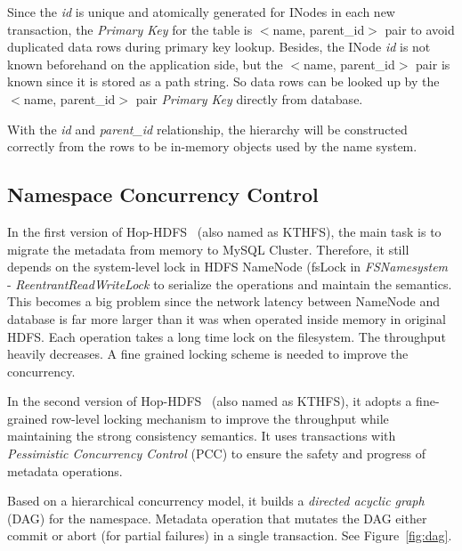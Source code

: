 \noindent Since the \textit{id} is unique and atomically generated for INodes in each new transaction, the \textit{Primary Key} for the table is $<$name, parent\_id$>$ pair to avoid duplicated data rows during primary key lookup. Besides, the INode \textit{id} is not known beforehand on the application side, but the $<$name, parent\_id$>$ pair is known since it is stored as a path string. So data rows can be looked up by the $<$name, parent\_id$>$ pair \textit{Primary Key} directly from database.

\noindent With the \textit{id} and \textit{parent\_id} relationship, the hierarchy will be constructed correctly from the rows to be in-memory objects used by the name system.

\subsection{Namespace Concurrency Control}

In the first version of Hop-HDFS~\cite{wasif2012distributed} (also named as KTHFS), the main task is to migrate the metadata from memory to MySQL Cluster. Therefore, it still depends on the system-level lock in HDFS NameNode (fsLock in \textit{FSNamesystem} - \textit{ReentrantReadWriteLock} to serialize the operations and maintain the semantics. This becomes a big problem since the network latency between NameNode and database is far more larger than it was when operated inside memory in original HDFS. Each operation takes a long time lock on the filesystem. The throughput heavily decreases. A fine grained locking scheme is needed to improve the concurrency.

\noindent In the second version of Hop-HDFS~\cite{peiro2013maintaining} (also named as KTHFS), it adopts a fine-grained row-level locking mechanism to improve the throughput while maintaining the strong consistency semantics. It uses transactions with \textit{Pessimistic Concurrency Control} (PCC) to ensure the safety and progress of metadata operations. 

\noindent Based on a hierarchical concurrency model, it builds a \textit{directed acyclic graph} (DAG) for the namespace. Metadata operation that mutates the DAG either commit or abort (for partial failures) in a single transaction. See Figure~\ref{fig:dag}.

